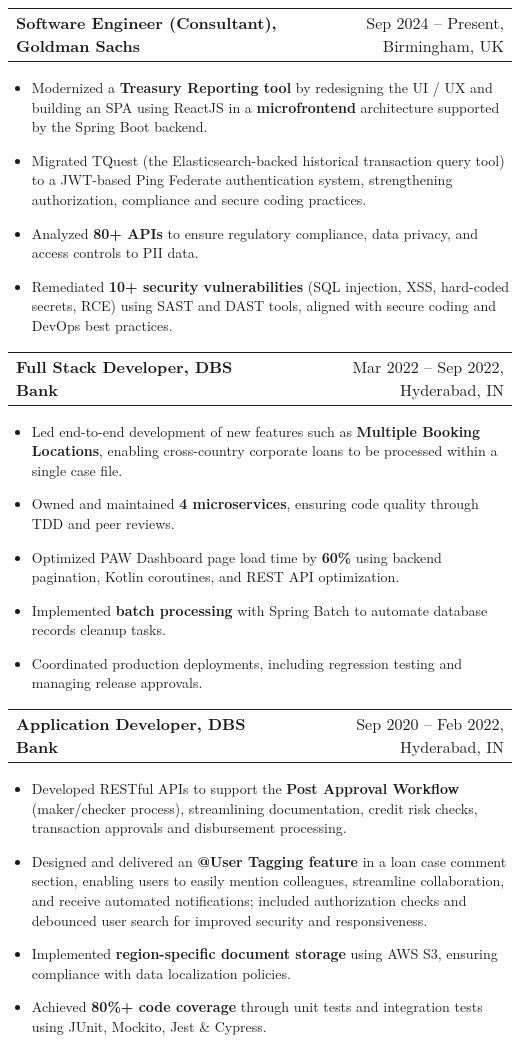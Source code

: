 \documentclass[a4paper,12pt]{article}
\makeatletter
\newenvironment{joblong}[2]
    {
    \begin{tabularx}{\linewidth}{@{}l X r@{}}
    \textbf{#1} & &  #2 \\
    \end{tabularx}
    \begin{minipage}[t]{\linewidth}
    \begin{itemize}[nosep,after=\strut, leftmargin=1em, itemsep=3pt,label=--]
    }
    {
    \end{itemize}
    \end{minipage}    
    }
\makeatother
\begin{document}
\begin{joblong}{Software Engineer (Consultant), Goldman Sachs}{Sep 2024 -- Present, Birmingham, UK}
\item Modernized a \textbf{Treasury Reporting tool} by redesigning the UI / UX and building an SPA using ReactJS in a \textbf{microfrontend} architecture supported by the Spring Boot backend.
\item Migrated TQuest (the Elasticsearch-backed historical transaction query tool) to a JWT-based Ping Federate authentication system, strengthening authorization, compliance and secure coding practices.
\item Analyzed \textbf{80+ APIs} to ensure regulatory compliance, data privacy, and access controls to PII data.
\item Remediated \textbf{10+ security vulnerabilities} (SQL injection, XSS, hard-coded secrets, RCE) using SAST and DAST tools, aligned with secure coding and DevOps best practices.
\end{joblong}
\begin{joblong}{Full Stack Developer, DBS Bank}{Mar 2022 -- Sep 2022, Hyderabad, IN}
\item Led end-to-end development of new features such as \textbf{Multiple Booking Locations}, enabling cross-country corporate loans to be processed within a single case file.
\item Owned and maintained \textbf{4 microservices}, ensuring code quality through TDD and peer reviews.
\item Optimized PAW Dashboard page load time by \textbf{60\%} using backend pagination, Kotlin coroutines, and REST API optimization.
\item Implemented \textbf{batch processing} with Spring Batch to automate database records cleanup tasks.
\item Coordinated production deployments, including regression testing and managing release approvals.
\end{joblong}
\begin{joblong}{Application Developer, DBS Bank}{Sep 2020 -- Feb 2022, Hyderabad, IN}
\item Developed RESTful APIs to support the \textbf{Post Approval Workflow} (maker/checker process), streamlining documentation, credit risk checks, transaction approvals and disbursement processing.
\item Designed and delivered an \textbf{@User Tagging feature} in a loan case comment section, enabling users to easily mention colleagues, streamline collaboration, and receive automated notifications; included authorization checks and debounced user search for improved security and responsiveness.
\item Implemented \textbf{region-specific document storage} using AWS S3, ensuring compliance with data localization policies.
\item Achieved \textbf{80\%+ code coverage} through unit tests and integration tests using JUnit, Mockito, Jest \& Cypress.
\end{joblong}
\end{document}

